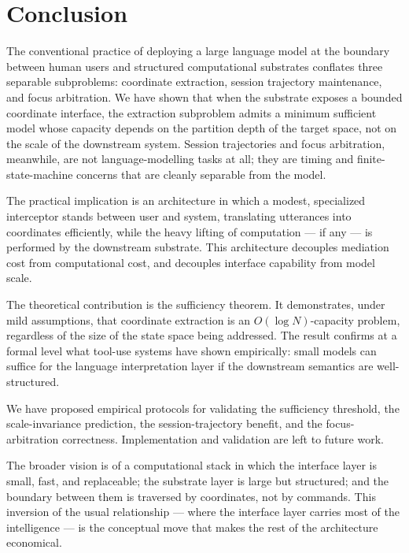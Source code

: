 \documentclass[11pt,a4paper]{article}
\theoremstyle{definition}
\theoremstyle{remark}
\begin{document}
\section{Conclusion}
\label{sec:conclusion}

The conventional practice of deploying a large language model at the boundary between human users and structured computational substrates conflates three separable subproblems: coordinate extraction, session trajectory maintenance, and focus arbitration. We have shown that when the substrate exposes a bounded coordinate interface, the extraction subproblem admits a minimum sufficient model whose capacity depends on the partition depth of the target space, not on the scale of the downstream system. Session trajectories and focus arbitration, meanwhile, are not language-modelling tasks at all; they are timing and finite-state-machine concerns that are cleanly separable from the model.

The practical implication is an architecture in which a modest, specialized interceptor stands between user and system, translating utterances into coordinates efficiently, while the heavy lifting of computation --- if any --- is performed by the downstream substrate. This architecture decouples mediation cost from computational cost, and decouples interface capability from model scale.

The theoretical contribution is the sufficiency theorem. It demonstrates, under mild assumptions, that coordinate extraction is an $O(\log N)$-capacity problem, regardless of the size of the state space being addressed. The result confirms at a formal level what tool-use systems have shown empirically: small models can suffice for the language interpretation layer if the downstream semantics are well-structured.

We have proposed empirical protocols for validating the sufficiency threshold, the scale-invariance prediction, the session-trajectory benefit, and the focus-arbitration correctness. Implementation and validation are left to future work.

The broader vision is of a computational stack in which the interface layer is small, fast, and replaceable; the substrate layer is large but structured; and the boundary between them is traversed by coordinates, not by commands. This inversion of the usual relationship --- where the interface layer carries most of the intelligence --- is the conceptual move that makes the rest of the architecture economical.



\end{document}
